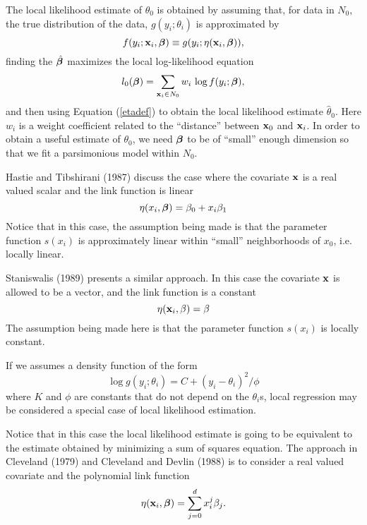 The local likelihood estimate of $\theta_0$ is obtained by 
assuming that, for data in $N_0$, the true distribution of the data,
$g(y_i;\theta_i)$ is approximated by
\begin{equation}
\label{approxdist}
f(y_i;{\mathbf x}_i,\mbox{\boldmath $\beta$\unboldmath}) \equiv  g(y_i; \eta({\mathbf x}_i,\mbox{\boldmath $\beta$\unboldmath}) ),
\end{equation}
finding the
$\hat{\mbox{\boldmath $\beta$\unboldmath}\:}\!$ maximizes the
local log-likelihood equation
\begin{equation}
\label{lle} %
l_0(\bb) = \sum_{\bx_i \in N_0} w_i \, \log f(y_i; \bb),
\end{equation}
and then using Equation (\ref{etadef}) to obtain the local 
likelihood estimate $\hat{\theta}_0$. Here $w_i$ is a weight
coefficient related to the ``distance'' between ${\mathbf x}_0$ and
${\mathbf x}_i$. In order to obtain
a useful estimate of $\theta_0$, we need $\mbox{\boldmath $\beta$\unboldmath}$ to be of ``small''
enough dimension so that we fit a parsimonious model within $N_0$.  

Hastie and Tibshirani (1987) \nocite{hast:tibs:1987} discuss the case
where the covariate ${\mathbf x}$ 
is a real 
valued scalar and the link function is linear 
\[
\eta(x_i, \mbox{\boldmath $\beta$\unboldmath}) = \beta_0 + x_i \beta_1
\]  
Notice that in this case, the assumption being made is that the 
parameter function $s(x_i)$ is approximately linear within
``small'' neighborhoods of $x_0$, i.e. locally linear.

Staniswalis (1989) \nocite{stan:1989} presents a similar approach. In
this case the 
covariate ${\mathbf x}$ is  allowed to be a vector, and the link function
is a constant
\[
\eta({\mathbf x}_i, \beta) = \beta
\]
The assumption being made here is that the 
parameter function $s(x_i)$ is locally constant.

If we assumes a density function 
of the form
\begin{equation}
\label{loess}
\log g(y_i; \theta_i) = C  + (y_i - \theta_i)^2 / \phi
\end{equation}
where $K$ and $\phi$ are constants that do not depend on the
$\theta_i$s,
local regression may be considered a special case of local
likelihood estimation.

Notice that in this case the local likelihood estimate is going to be
equivalent to the estimate obtained by 
minimizing a sum of squares equation. The approach in
Cleveland (1979) \nocite{clev:1979} and Cleveland and Devlin (1988)
\nocite{clev:devl:1988} is to consider a real valued covariate 
and the polynomial link function
\[
\eta({\mathbf x}_i,\mbox{\boldmath $\beta$\unboldmath}) = \sum_{j=0}^d x_i^j \beta_j.
\]

